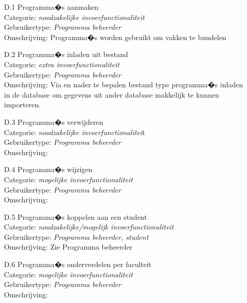 \documentclass{article}
\begin{document}
\begin{itemize}
\item[D.1] Programma�s aanmaken \\
Categorie: \textit{noodzakelijke invoerfunctionaliteit} \\
Gebruikertype: \textit{Programma beheerder} \\
Omschrijving: Programma�s worden gebruikt om vakken te bundelen \\[-3mm]

\item[D.2] Programma�s inladen uit bestand \\
Categorie: \textit{extra  invoerfunctionaliteit} \\
Gebruikertype: \textit{Programma beheerder} \\
Omschrijving: Via en nader te bepalen bestand type  programma�s inladen in de database om gegevens uit ander database makkelijk te kunnen importeren. \\[-3mm]

\item[D.3] Programma�s verwijderen \\
Categorie: \textit{noodzakelijke invoerfunctionalitei}t \\
Gebruikertype: \textit{Programma beheerder }\\
Omschrijving: \\[-3mm]

\item[D.4] Programma�s wijzigen \\
Categorie: \textit{mogelijke invoerfunctionaliteit} \\
Gebruikertype: \textit{Programma beheerder} \\
Omschrijving: \\[-3mm]

\item[D.5] Programma�s koppelen aan een student \\
Categorie: \textit{noodzakelijke/mogelijk  invoerfunctionaliteit} \\
Gebruikertype: \textit{Programma beheerder, student} \\
Omschrijving: Zie Programma beheerder \\[-3mm]

\item[D.6] Programma�s onderverdelen per faculteit \\
Categorie: \textit{mogelijke invoerfunctionaliteit} \\
Gebruikertype: \textit{Programma beheerder} \\
Omschrijving: \\[-3mm]
\end{itemize}
\end{document}
